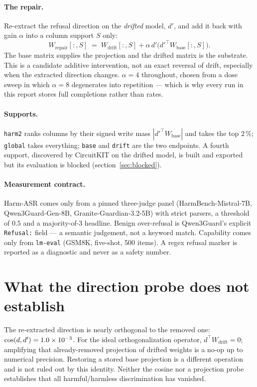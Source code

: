\documentclass[10pt,a4paper]{article}
\newcommand{\code}[1]{\texttt{\small #1}}
\begin{document}
\paragraph{The repair.} Re-extract the refusal direction on the \emph{drifted} model, $d'$, and add
it back with gain $\alpha$ into a column support $S$ only:
\begin{equation}
W_{\text{repair}}[:,S] \;=\; W_{\text{drift}}[:,S] + \alpha\, d' \bigl(d'^{\top} W_{\text{base}}[:,S]\bigr).
\end{equation}
The base matrix supplies the projection and the drifted matrix is the substrate. This is a candidate
additive intervention, not an exact reversal of drift, especially when the extracted direction changes. $\alpha=4$ throughout, chosen from a dose sweep in which
$\alpha=8$ degenerates into repetition --- which is why every run in this report stores full
completions rather than rates.

\paragraph{Supports.} \code{harm2} ranks columns by their signed write mass
$|d'^{\top}W_{\text{base}}|$ and takes the top $2\,\%$; \code{global} takes everything; \code{base}
and \code{drift} are the two endpoints. A fourth support, discovered by CircuitKIT on the drifted
model, is built and exported but its evaluation is blocked (section~\ref{sec:blocked}).

\paragraph{Measurement contract.} Harm-ASR comes only from a pinned three-judge panel
(HarmBench-Mistral-7B, Qwen3Guard-Gen-8B, Granite-Guardian-3.2-5B) with strict parsers, a threshold
of $0.5$ and a majority-of-3 headline. Benign over-refusal is Qwen3Guard's explicit \code{Refusal:}
field --- a semantic judgement, not a keyword match. Capability comes only from \code{lm-eval}
(GSM8K, five-shot, 500 items). A regex refusal marker is reported as a diagnostic and never as a
safety number.

\section{What the direction probe does not establish}

The re-extracted direction is nearly orthogonal to the removed one: $\cos(d,d')=1.0\times 10^{-3}$.
For the ideal orthogonalization operator, $d^{\top}W_{\text{drift}}=0$; amplifying that already-removed
projection of drifted weights is a no-op up to numerical precision. Restoring a stored base projection
is a different operation and is not ruled out by this identity. Neither the cosine nor a projection
probe establishes that all harmful/harmless discrimination has vanished.
\end{document}
